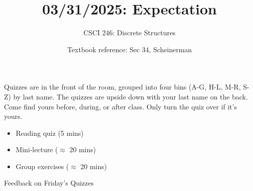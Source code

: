 \documentclass[10pt]{beamer}
\begin{document}




\title{03/31/2025: Expectation}
\author{CSCI 246: Discrete Structures}
\date{Textbook reference: Sec 34, Scheinerman}

\begin{frame}
    \titlepage 
\end{frame}


\begin{frame}
\small
\begin{mygreenbox}[title=Graded Quiz Pickup]
Quizzes are in the front of the room, grouped into four bins (A-G, H-L, M-R, S-Z) by last name. The quizzes are upside down with your last name on the back. Come find yours before, during, or after class. Only turn the quiz over if it's yours. \\ 

\end{mygreenbox} 
\vfill 

\begin{myredbox}[title=Today's Agenda]
\begin{itemize}
	\item Reading quiz (5 mins)
	\item Mini-lecture ($\approx$ 20 mins)
	\item Group exercises ($\approx$ 20 mins)
\end{itemize}


\end{myredbox}
\vfill 

\end{frame}






\begin{frame}[standout]
Feedback on Friday's Quizzes
\end{frame}
\end{document}
